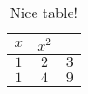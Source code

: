 \begin{table}[ht]
	\begin{center}
	\caption{Nice table!}
	\label{tab:niceTable}
		\begin{tabular}{ccc}
		\toprule
			$x$ & $x^2$\\
			\midrule
			$1$ & $2$ & $3$\\
			$1$ & $4$ & $9$\\
		\bottomrule
		\end{tabular}
	\end{center}
\end{table}